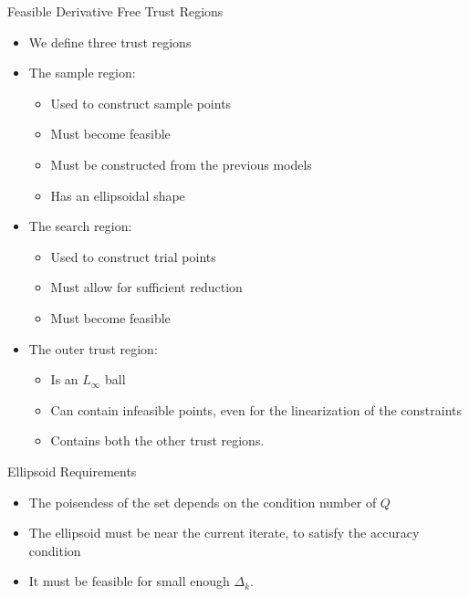 \documentclass{beamer}
\newcommand{\dk}{{\Delta_k}}
\begin{document}
\begin{frame}{Feasible Derivative Free Trust Regions}
    \begin{itemize}
        \item We define three trust regions
        \item The sample region:
        	\begin{itemize}
        		\item Used to construct sample points
        		\item Must become feasible
        		\item Must be constructed from the previous models
        		\item Has an ellipsoidal shape
        	\end{itemize}
        \item The search region:
            \begin{itemize}
            	\item Used to construct trial points
            	\item Must allow for sufficient reduction
            	\item Must become feasible
            \end{itemize}
        \item The outer trust region:
            \begin{itemize}
                \item Is an $L_{\infty}$ ball
                \item Can contain infeasible points, even for the linearization of the constraints
                \item Contains both the other trust regions.
            \end{itemize}
    \end{itemize}
\end{frame}


\begin{frame}{Ellipsoid Requirements}
	\begin{itemize}
		\item The poisendess of the set depends on the condition number of $Q$
		\item The ellipsoid must be near the current iterate, to satisfy the accuracy condition
		\item It must be feasible for small enough $\dk$.
	\end{itemize}
\end{frame}
\end{document}

